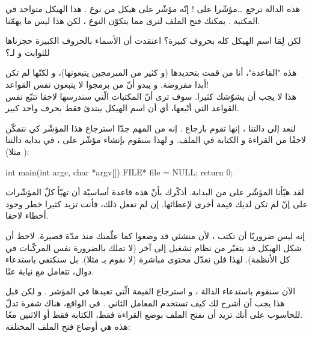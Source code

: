 هذه الدالة ترجع \dots مؤشّرا على
!
إنّه مؤشّر على هيكل من نوع
.
هذا الهيكل متواجد في المكتبة
.
يمكنك فتح الملف لترى مما يتكوّن النوع
،
لكن هذا ليس ما يهمّنا.

\begin{question}
  لكن لِمَا اسم الهيكل كله بحروف كبيرة؟ اعتقدت أن الأسماء بالحروف الكبيرة حجزناها للثوابت و لـ؟
\end{question}

هذه "القاعدة"، أنا من قمت بتحديدها (و كثير من المبرمجين يتبعونها)، و لكنّها لم تكن أبدا مفروضة. و يبدو أنّ من برمجوا
لا يتبعون نفس القواعد!\\
هذا لا يجب أن يشوّشك كثيرا. سوف ترى أنّ المكتبات الّتي سندرسها لاحقا تتبّع نفس القواعد التي أتّبعها، أي أن اسم الهيكل يبتدئ فقط بحرف واحد كبير.

لنعد إلى دالتنا
،
إنها تقوم بارجاع
.
إنه من المهم جدّا استرجاع هذا المؤشّر كي نتمكّن لاحقًا من القراءة و الكتابة في الملف.  و لهذا سنقوم بإنشاء مؤشّر على
،
في بداية دالتنا
(
مثلا):

\begin{Csource}
int main(int argc, char *argv[])
{
	FILE* file = NULL;
	return 0;
}
\end{Csource}

لقد هيّأنا المؤشّر على
من البداية. أذكّرك بأنّ هذه قاعدة أساسيّة أن تهيّأ كلّ المؤشّرات على
إنّ لم تكن لديك قيمة أخرى لإعطائها. إن لم تفعل ذلك، فأنت تزيد كثيرا خطر وجود أخطاء لاحقا.

\begin{information}
  إنه ليس ضروريًا أن تكتب
،
لأن منشئي
قد وضعوا
كما علّمتك منذ مدّة قصيرة.
لاحظ أن شكل الهيكل قد يتغيّر من نظام تشغيل إلى آخر (لا تملك بالضرورة نفس المركّبات في كل الأنظمة). لهذا فلن نعدّل محتوى
مباشرة (لا نقوم بـ
مثلا). بل سنكتفي باستدعاء دوال، تتعامل مع
نيابة عنًا.
\end{information}

الآن سنقوم باستدعاء الدالة
،
و استرجاع القيمة الّتي تعيدها في المؤشر
.
و لكن قبل هذا يجب أن أشرح لك كيف تستخدم المعامل الثاني
.
في الواقع، هناك شفرة تدلّ للحاسوب على أنك تريد أن تفتح الملف بوضع القراءة فقط، الكتابة فقط أو الاثنين معًا.\\
هذه هي أوضاع فتح الملف المختلفة:

